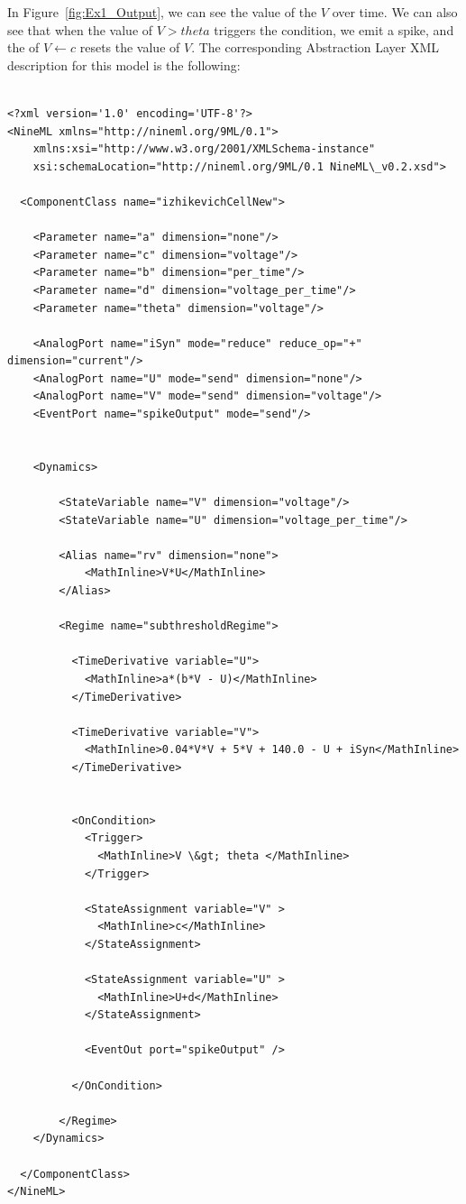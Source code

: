 \documentclass[draftspec]{ninemlspec}
\newcommand{\StateVariable}{\textbf{\class{StateVariable}}\xspace}
\newcommand{\StateAssignment}{\textbf{\class{StateAssignment}}\xspace}
\begin{document}
In Figure~\ref{fig:Ex1_Output}, we can see the value of the \StateVariable $V$
over time. We can also see that when the value of $V>theta$ triggers the
condition, we emit a spike, and the \StateAssignment of $V \leftarrow c$ resets
the value of $V$.
%
\noindent
The corresponding Abstraction Layer XML description for this model is the following:
%
\begin{lstlisting}

<?xml version='1.0' encoding='UTF-8'?>
<NineML xmlns="http://nineml.org/9ML/0.1">
    xmlns:xsi="http://www.w3.org/2001/XMLSchema-instance"
    xsi:schemaLocation="http://nineml.org/9ML/0.1 NineML\_v0.2.xsd">

  <ComponentClass name="izhikevichCellNew">

    <Parameter name="a" dimension="none"/>
    <Parameter name="c" dimension="voltage"/>
    <Parameter name="b" dimension="per_time"/>
    <Parameter name="d" dimension="voltage_per_time"/>
    <Parameter name="theta" dimension="voltage"/>

    <AnalogPort name="iSyn" mode="reduce" reduce_op="+" dimension="current"/>
    <AnalogPort name="U" mode="send" dimension="none"/>
    <AnalogPort name="V" mode="send" dimension="voltage"/>
    <EventPort name="spikeOutput" mode="send"/>


    <Dynamics>

        <StateVariable name="V" dimension="voltage"/>
        <StateVariable name="U" dimension="voltage_per_time"/>

        <Alias name="rv" dimension="none">
            <MathInline>V*U</MathInline>
        </Alias>

        <Regime name="subthresholdRegime">

          <TimeDerivative variable="U">
            <MathInline>a*(b*V - U)</MathInline>
          </TimeDerivative>

          <TimeDerivative variable="V">
            <MathInline>0.04*V*V + 5*V + 140.0 - U + iSyn</MathInline>
          </TimeDerivative>


          <OnCondition>
            <Trigger>
              <MathInline>V \&gt; theta </MathInline>
            </Trigger>

            <StateAssignment variable="V" >
              <MathInline>c</MathInline>
            </StateAssignment>

            <StateAssignment variable="U" >
              <MathInline>U+d</MathInline>
            </StateAssignment>

            <EventOut port="spikeOutput" />

          </OnCondition>

        </Regime>
    </Dynamics>

  </ComponentClass>
</NineML>
\end{lstlisting}
\end{document}
